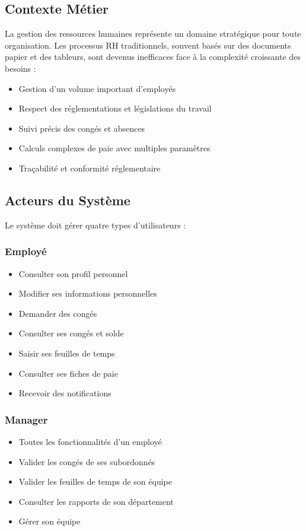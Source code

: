 \documentclass[12pt,a4paper,twoside]{report}
\begin{document}
\subsection{Contexte Métier}

La gestion des ressources humaines représente un domaine stratégique pour toute organisation. Les processus RH traditionnels, souvent basés sur des documents papier et des tableurs, sont devenus inefficaces face à la complexité croissante des besoins :
\begin{itemize}
    \item Gestion d'un volume important d'employés
    \item Respect des réglementations et législations du travail
    \item Suivi précis des congés et absences
    \item Calculs complexes de paie avec multiples paramètres
    \item Traçabilité et conformité réglementaire
\end{itemize}

\subsection{Acteurs du Système}

Le système doit gérer quatre types d'utilisateurs :

\subsubsection{Employé}
\begin{itemize}
    \item Consulter son profil personnel
    \item Modifier ses informations personnelles
    \item Demander des congés
    \item Consulter ses congés et solde
    \item Saisir ses feuilles de temps
    \item Consulter ses fiches de paie
    \item Recevoir des notifications
\end{itemize}

\subsubsection{Manager}
\begin{itemize}
    \item Toutes les fonctionnalités d'un employé
    \item Valider les congés de ses subordonnés
    \item Valider les feuilles de temps de son équipe
    \item Consulter les rapports de son département
    \item Gérer son équipe
\end{itemize}
\end{document}
